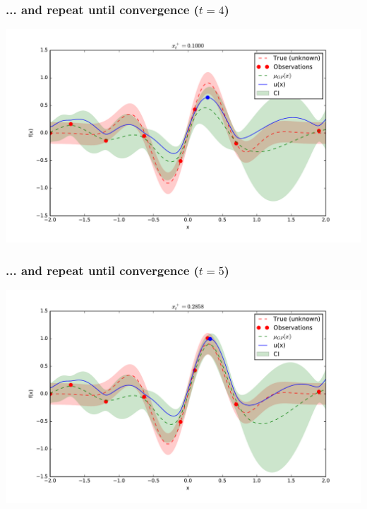\documentclass{beamer}
\begin{document}
\begin{frame}
    \frametitle{... and repeat until convergence ($t=4$)}
    \begin{center}
        \includegraphics[width=\textwidth]{code/fig4-4.pdf}
    \end{center}
\end{frame}

\begin{frame}
    \frametitle{... and repeat until convergence ($t=5$)}
    \begin{center}
        \includegraphics[width=\textwidth]{code/fig4-5.pdf}
    \end{center}
\end{frame}
\end{document}
